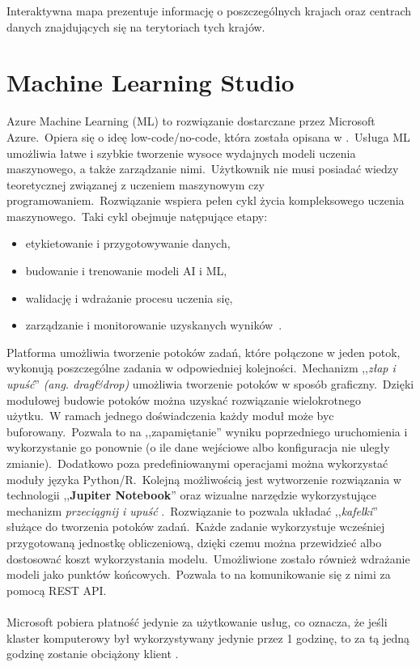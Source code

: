 Interaktywna mapa prezentuje informację o poszczególnych krajach oraz centrach danych znajdujących się na terytoriach tych krajów.

\section{Machine Learning Studio}
Azure Machine Learning (ML) to rozwiązanie dostarczane przez Microsoft Azure.\ Opiera się o ideę low-code/no-code, która została opisana w .\ Usługa ML umożliwia łatwe i szybkie tworzenie wysoce wydajnych modeli uczenia maszynowego, a także zarządzanie nimi.\ Użytkownik nie musi posiadać wiedzy teoretycznej związanej z uczeniem maszynowym czy programowaniem.\ Rozwiązanie wspiera pełen cykl życia kompleksowego uczenia maszynowego.\ Taki cykl obejmuje natępujące etapy:
\begin{itemize}
    \item etykietowanie i przygotowywanie danych,
    \item budowanie i trenowanie modeli AI i ML,
    \item walidację i wdrażanie procesu uczenia się,
    \item zarządzanie i monitorowanie uzyskanych wyników~\cite{MicrosoftAzure}.
\end{itemize}


Platforma umożliwia tworzenie potoków zadań, które połączone w jeden potok, wykonują poszczególne zadania w odpowiedniej kolejności.\ Mechanizm ,,\textit{złap i upuść}'' \textit{(ang. drag\&drop)} umożliwia tworzenie potoków w sposób graficzny.\ Dzięki modułowej budowie potoków można uzyskać rozwiązanie wielokrotnego użytku.\ W ramach jednego doświadczenia każdy moduł może byc buforowany.\ Pozwala to na ,,zapamiętanie'' wyniku poprzedniego uruchomienia i wykorzystanie go ponownie (o ile dane wejściowe albo konfiguracja nie uległy zmianie).\ Dodatkowo poza predefiniowanymi operacjami można wykorzystać moduły języka Python/R.\ Kolejną możliwością jest wytworzenie rozwiązania w technologii ,,\textbf{Jupiter Notebook}'' oraz wizualne narzędzie wykorzystujące mechanizm \textit{przeciągnij i upuść} .\ Rozwiązanie to pozwala układać ,,\textit{kafelki}'' służące do tworzenia potoków zadań.\ Każde zadanie wykorzystuje wcześniej przygotowaną jednostkę obliczeniową, dzięki czemu można przewidzieć albo dostosować koszt wykorzystania modelu.\ Umożliwione zostało również wdrażanie modeli jako punktów końcowych.\ Pozwala to na komunikowanie się z nimi za pomocą REST API.
\\ \\
Microsoft pobiera płatność jedynie za użytkowanie usług, co oznacza, że jeśli klaster komputerowy był wykorzystywany jedynie przez 1 godzinę, to za tą jedną godzinę zostanie obciążony klient \cite{MicrosoftAzuref}.
